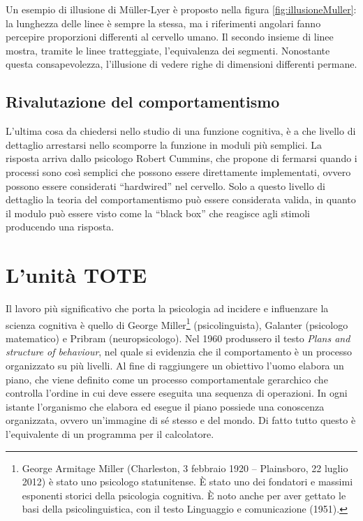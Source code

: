 Un esempio di illusione di Müller-Lyer è proposto nella figura \ref{fig:illusioneMuller}: la lunghezza delle linee è sempre la stessa, ma i riferimenti angolari fanno percepire proporzioni differenti al cervello umano. Il secondo insieme di linee mostra, tramite le linee tratteggiate, l'equivalenza dei segmenti. Nonostante questa consapevolezza, l'illusione di vedere righe di dimensioni differenti permane.

\subsection{Rivalutazione del comportamentismo}
L'ultima cosa da chiedersi nello studio di una funzione cognitiva, è a che livello di dettaglio arrestarsi nello scomporre la funzione in moduli più semplici. La risposta arriva dallo psicologo Robert Cummins, che propone di fermarsi quando i processi sono così semplici che possono essere direttamente implementati, ovvero possono essere considerati ``hardwired'' nel cervello. Solo a questo livello di dettaglio la teoria del comportamentismo può essere considerata valida, in quanto il modulo può essere visto come la ``black box'' che reagisce agli stimoli producendo una risposta. 

\section{L'unità TOTE}
Il lavoro più significativo che porta la psicologia ad incidere e influenzare la scienza cognitiva è quello di George Miller\footnote{George Armitage Miller (Charleston, 3 febbraio 1920 – Plainsboro, 22 luglio 2012) è stato uno psicologo statunitense. È stato uno dei fondatori e massimi esponenti storici della psicologia cognitiva. È noto anche per aver gettato le basi della psicolinguistica, con il testo Linguaggio e comunicazione (1951).} (psicolinguista), Galanter (psicologo matematico) e Pribram (neuropsicologo). Nel 1960 produssero il testo \emph{Plans and structure of behaviour}, nel quale si evidenzia che il comportamento è un processo organizzato su più livelli. Al fine di raggiungere un obiettivo l’uomo elabora un piano, che viene definito come un processo comportamentale gerarchico che controlla l’ordine in cui deve essere eseguita una sequenza di operazioni. In ogni istante l’organismo che elabora ed esegue il piano possiede una conoscenza organizzata, ovvero un’immagine di sé stesso e del mondo. Di fatto tutto questo è l’equivalente di un programma per il calcolatore.

